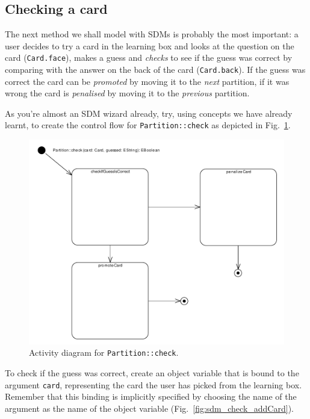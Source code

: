 \subsection{Checking a card}

The next method we shall model with SDMs is probably the most important: a
user decides to try a card in the learning box and looks at the question on the
card (\texttt{Card.face}), makes a guess and \emph{checks} to see if the guess
was correct by comparing with the answer on the back of the card
(\texttt{Card.back}).  If the guess was correct the card can be \emph{promoted}
by moving it to the \emph{next} partition, if it was wrong the card is
\emph{penalised} by moving it to the \emph{previous} partition.

As you're almost an SDM wizard already, try, using concepts we have
already learnt, to create the control flow for \texttt{Partition::check} as
depicted in Fig.~\ref{fig:sdm_check_start}.

\begin{figure}[htbp]
\begin{center}
  \includegraphics[width=\textwidth]{pics/sdmBilder/check/sdm16RAW.pdf}
  \caption{Activity diagram for \texttt{Partition::check}.}  
  \label{fig:sdm_check_start}
\end{center}
\end{figure}
 
To check if the guess was correct, create an object variable that is bound to
the argument \texttt{card}, representing the card the user has picked from the
learning box.  Remember that this binding is implicitly specified by choosing the
name of the argument as the name of the object variable
(Fig.~\ref{fig:sdm_check_addCard}).


